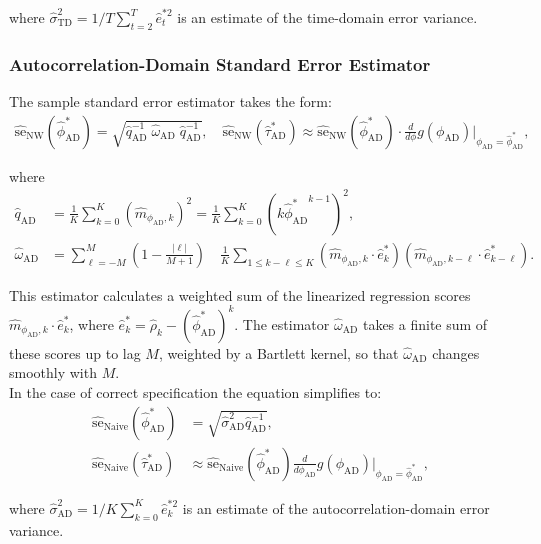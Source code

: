 \documentclass[9pt]{article}
\newcommand{\hatsigmatd}{\hat{\sigma}_{\scriptscriptstyle\text{TD}}}
\newcommand{\phiad}{\phi_{\scriptscriptstyle\text{AD}}}
\newcommand{\hatphiad}{\hat{\phi}^*_{\scriptscriptstyle\text{AD}}}
\newcommand{\hattauad}{\hat{\tau}^*_{\scriptscriptstyle\text{AD}}}
\newcommand{\hatqad}{\hat{q}_{\scriptscriptstyle\text{AD}}}
\newcommand{\hatomegaad}{\hat{\omega}_{\scriptscriptstyle\text{AD}}}
\newcommand{\hatsigmaad}{\hat{\sigma}_{\scriptscriptstyle\text{AD}}}
\begin{document}
\noindent where $\hatsigmatd^2 = 1/T \sum_{t=2}^T \hat e_t^{*2}$ is an estimate of the time-domain error variance.

\subsubsection{Autocorrelation-Domain Standard Error Estimator}\label{sec:stderr-autocorrelation-domain_}
The sample standard error estimator takes the form:
\begin{align}\label{eq:stderr-autocorrelation-domain_}
\widehat{\text{se}}_{\text{NW}}(\hatphiad) = \sqrt{\hatqad^{-1}\;\hatomegaad\; \hatqad^{-1}}, \quad
\widehat{\text{se}}_{\text{NW}}(\hattauad) \approx \widehat{\text{se}}_{\text{NW}}(\hatphiad) \cdot \frac{d}{d\phi} g(\phiad)\big|_{\phiad=\hatphiad},
\end{align}

\noindent where
\begin{align}
    \hatqad &= \frac{1}{K} \sum_{k=0}^K (\hat m_{{\phiad},k})^2 = \frac{1}{K} \sum_{k=0}^K (k {\hatphiad}^{k-1})^2,\\
    \hatomegaad &= \sum_{\ell=-M}^M \left(1 - \frac{|\ell|}{M+1}\right) \quad \frac{1}{K} \sum_{1 \le k - \ell \le K} (\hat m_{{\phiad}, k} \cdot \hat e_k^*) (\hat m_{{\phiad}, k-\ell} \cdot \hat e_{k-\ell}^*).\label{eq:nls_q_omega_}
\end{align}

\noindent This estimator calculates a weighted sum of the linearized regression scores $\hat m_{\phiad, k} \cdot \hat e_k^*$, where $\hat e_k^* = \hat\rho_k - (\hatphiad)^k$. The estimator $\hatomegaad$ takes a finite sum of these scores up to lag $M$, weighted by a Bartlett kernel, so that $\hatomegaad$ changes smoothly with $M$.\\

\noindent In the case of correct specification the equation simplifies to:
\begin{align}
    \widehat{\text{se}}_\text{Naive}(\hatphiad) &= \sqrt{\hatsigmaad^2 \hatqad^{-1}},\\
    \widehat{\text{se}}_\text{Naive}(\hattauad) &\approx \widehat{\text{se}}_{\text{Naive}}(\hatphiad) \frac{d}{d\phiad} g(\phiad)\big|_{\phiad=\hatphiad},
\end{align}

\noindent where $\hatsigmaad^2 = 1/K \sum_{k=0}^K \hat e_k^{*2}$ is an estimate of the autocorrelation-domain error variance.\\
\end{document}
